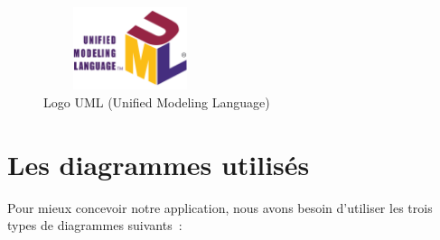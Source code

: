\documentclass[12pt]{report}
\begin{document}
\vspace{0.1in}

\begin{figure}[h]
\centering
    \includegraphics[width = 2in, height = 0.95in]{../images/UMLlogo.png}
  \caption{Logo UML (Unified Modeling Language)}
\end{figure}

\newpage


\section{Les diagrammes utilisés}
Pour mieux concevoir notre application, nous avons besoin d’utiliser les trois types de diagrammes suivants :

\vspace{0.1in}
\end{document}
